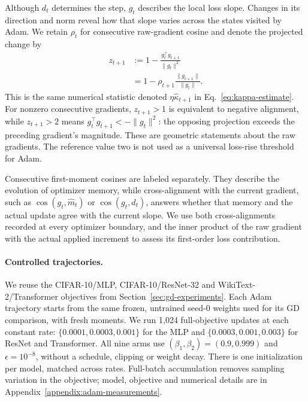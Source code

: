 Although $d_t$ determines the step, $g_t$ describes the local loss slope.
Changes in its direction and norm reveal how that slope varies across
the states visited by Adam. We retain $\rho_t$ for consecutive raw-gradient
cosine and denote the projected change by
\begin{equation}
\begin{aligned}
z_{t+1}
&:=1-\frac{g_t^\top g_{t+1}}{\|g_t\|^2}\\
&=1-\rho_{t+1}\frac{\|g_{t+1}\|}{\|g_t\|}.
\end{aligned}
\label{eq:adam-projected-response}
\end{equation}
This is the same numerical statistic denoted
$\eta\widehat\kappa_{t+1}$ in Eq.~\eqref{eq:kappa-estimate}.
For nonzero consecutive gradients, $z_{t+1}>1$ is equivalent to negative
alignment, while $z_{t+1}>2$ means
$g_t^\top g_{t+1}<-\|g_t\|^2$: the opposing projection exceeds the preceding
gradient's magnitude. These are geometric statements about the raw
gradients. The reference value two is not used as a universal loss-rise
threshold for Adam.

Consecutive first-moment cosines are labeled separately. They describe
the evolution of optimizer memory, while cross-alignment with the current
gradient, such as $\cos(g_t,\widehat m_t)$ or $\cos(g_t,d_t)$, answers
whether that memory and the actual update agree with the current slope.
We use both cross-alignments recorded at every optimizer boundary, and
the inner product of the raw gradient with the actual applied increment
to assess its first-order loss contribution.

\paragraph{Controlled trajectories.}

We reuse the CIFAR-10/MLP, CIFAR-10/ResNet-32 and WikiText-2/Transformer
objectives from Section~\ref{sec:gd-experiments}. Each Adam trajectory starts
from the same frozen, untrained seed-0 weights used for its GD comparison,
with fresh moments. We run 1,024 full-objective updates at each constant
rate: $\{0.0001,0.0003,0.001\}$ for the MLP and
$\{0.0003,0.001,0.003\}$ for ResNet and Transformer. All nine arms use
$(\beta_1,\beta_2)=(0.9,0.999)$ and $\epsilon=10^{-8}$, without a schedule,
clipping or weight decay. There is one initialization per model, matched
across rates. Full-batch accumulation removes sampling variation in the
objective; model, objective and numerical details are in
Appendix~\ref{appendix:adam-measurements}.

